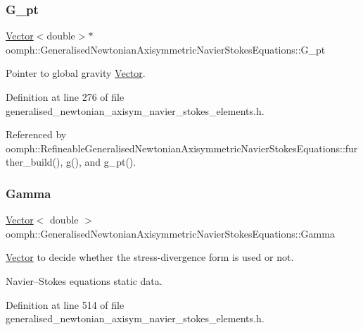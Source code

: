 \subsubsection{\texorpdfstring{G\+\_\+pt}{G\_pt}}
{\footnotesize\ttfamily \hyperlink{classoomph_1_1Vector}{Vector}$<$double$>$$\ast$ oomph\+::\+Generalised\+Newtonian\+Axisymmetric\+Navier\+Stokes\+Equations\+::\+G\+\_\+pt\hspace{0.3cm}{\ttfamily [protected]}}



Pointer to global gravity \hyperlink{classoomph_1_1Vector}{Vector}. 



Definition at line 276 of file generalised\+\_\+newtonian\+\_\+axisym\+\_\+navier\+\_\+stokes\+\_\+elements.\+h.



Referenced by oomph\+::\+Refineable\+Generalised\+Newtonian\+Axisymmetric\+Navier\+Stokes\+Equations\+::further\+\_\+build(), g(), and g\+\_\+pt().

\mbox{\label{classoomph_1_1GeneralisedNewtonianAxisymmetricNavierStokesEquations_a493708aa45b87667b7ba996a059adc93}} 
\subsubsection{\texorpdfstring{Gamma}{Gamma}}
{\footnotesize\ttfamily \hyperlink{classoomph_1_1Vector}{Vector}$<$ double $>$ oomph\+::\+Generalised\+Newtonian\+Axisymmetric\+Navier\+Stokes\+Equations\+::\+Gamma\hspace{0.3cm}{\ttfamily [static]}}



\hyperlink{classoomph_1_1Vector}{Vector} to decide whether the stress-\/divergence form is used or not. 

Navier--Stokes equations static data. 

Definition at line 514 of file generalised\+\_\+newtonian\+\_\+axisym\+\_\+navier\+\_\+stokes\+\_\+elements.\+h.



